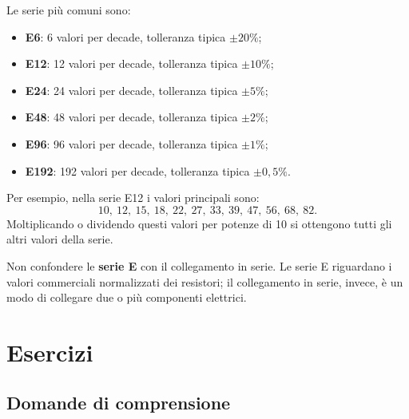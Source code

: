 Le serie più comuni sono:

\begin{itemize}[leftmargin=1cm]
  \item \textbf{E6}: 6 valori per decade, tolleranza tipica \(\pm 20\%\);
  \item \textbf{E12}: 12 valori per decade, tolleranza tipica \(\pm 10\%\);
  \item \textbf{E24}: 24 valori per decade, tolleranza tipica \(\pm 5\%\);
  \item \textbf{E48}: 48 valori per decade, tolleranza tipica \(\pm 2\%\);
  \item \textbf{E96}: 96 valori per decade, tolleranza tipica \(\pm 1\%\);
  \item \textbf{E192}: 192 valori per decade, tolleranza tipica \(\pm 0{,}5\%\).
\end{itemize}

Per esempio, nella serie E12 i valori principali sono:
\[
10,\ 12,\ 15,\ 18,\ 22,\ 27,\ 33,\ 39,\ 47,\ 56,\ 68,\ 82.
\]
Moltiplicando o dividendo questi valori per potenze di 10 si ottengono tutti gli altri valori della serie.

\begin{attenzione}
Non confondere le \textbf{serie E} con il collegamento in serie. Le serie E riguardano i valori commerciali normalizzati dei resistori; il collegamento in serie, invece, è un modo di collegare due o più componenti elettrici.
\end{attenzione}



\section{Esercizi}

\subsection{Domande di comprensione}

